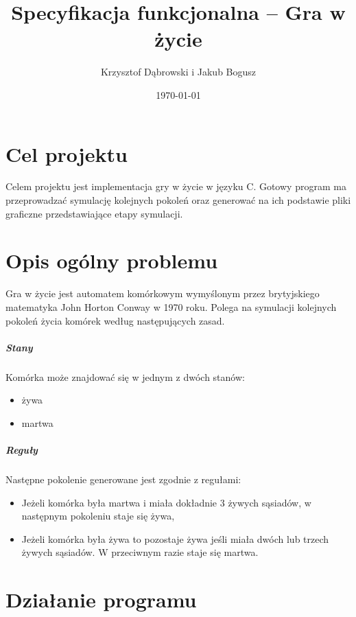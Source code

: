 \documentclass{report}
\title{Specyfikacja funkcjonalna -- Gra w życie}
\author{Krzysztof Dąbrowski i Jakub Bogusz}
\date{\today}
\begin{document}
\maketitle{}

\tableofcontents{}

\chapter{Cel projektu}
Celem projektu jest implementacja gry w życie w języku C. Gotowy program ma przeprowadzać symulację kolejnych pokoleń oraz generować na ich podstawie pliki graficzne przedstawiające etapy symulacji.

\chapter{Opis ogólny problemu}
Gra w życie jest automatem komórkowym wymyślonym przez brytyjskiego matematyka John Horton Conway %
w 1970 roku. Polega na symulacji kolejnych pokoleń życia komórek według następujących zasad.


\paragraph{Stany}  Komórka może znajdować się w jednym z dwóch stanów:
\begin{itemize}
\item żywa
\item martwa
\end{itemize}

\paragraph{Reguły} Następne pokolenie generowane jest zgodnie z regułami:
\begin{itemize}
\item Jeżeli komórka była martwa i miała dokładnie 3 żywych sąsiadów, w następnym pokoleniu staje się żywa,
\item Jeżeli komórka była żywa to pozostaje żywa jeśli miała dwóch lub trzech żywych sąsiadów. W przeciwnym razie staje się martwa.
\end{itemize}

\chapter{Działanie programu}
\end{document}
